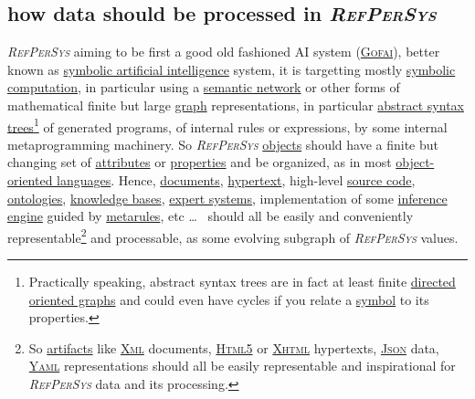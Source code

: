 \documentclass[11pt,a4paper,svgnames]{article}
\newcommand{\RefPerSys}{{\textit{\textsc{RefPerSys}}}}
\begin{document}
\subsection{how data should be processed in \RefPerSys}
\label{subsec:howdata}

{\RefPerSys} aiming to be first a good old fashioned AI system
(\href{http://bootstrappingartificialintelligence.fr/WordPress3/2013/12/the-future-of-ai-is-the-good-old-fashioned-artificial-intelligence/}{\textsc{Gofai}}),
better known as
\href{https://en.wikipedia.org/wiki/Symbolic\_artificial\_intelligence}{symbolic
  artificial intelligence} system, it is targetting mostly
\href{https://en.wikipedia.org/wiki/Computer\_algebra}{symbolic
  computation}, in particular using a
\href{https://en.wikipedia.org/wiki/Semantic\_network}{semantic
  network} or other forms of mathematical finite but large
\href{https://en.wikipedia.org/wiki/Graph\_(discrete\_mathematics)}{graph}
representations, in particular
\href{https://en.wikipedia.org/wiki/Abstract\_syntax\_tree}{abstract
  syntax trees}\footnote{Practically speaking, abstract syntax trees
are in fact at least finite
\href{https://en.wikipedia.org/wiki/Directed_acyclic_graph}{directed
  oriented graphs} and could even have cycles if you relate a
\href{https://en.wikipedia.org/wiki/Symbol\_(programming)}{symbol} to
its properties.} of generated programs, of internal rules or
expressions, by some internal metaprogramming machinery. So
{\RefPerSys}
\href{https://en.wikipedia.org/wiki/Object_(computer_science)}{objects}
should have a finite but changing set of
\href{https://en.wikipedia.org/wiki/Attribute_(computing)}{attributes}
or
\href{https://en.wikipedia.org/wiki/Property_(programming)}{properties}
and be organized, as in most
\href{https://en.wikipedia.org/wiki/Object-oriented_programming}{object-oriented
  languages}. Hence,
\href{https://en.wikipedia.org/wiki/Electronic\_document}{documents},
\href{https://en.wikipedia.org/wiki/Hypertext}{hypertext}, high-level
\href{https://en.wikipedia.org/wiki/Source\_code}{source code},
\href{https://en.wikipedia.org/wiki/Ontology\_(information\_science)}{ontologies},
\href{https://en.wikipedia.org/wiki/Knowledge\_base}{knowledge bases},
\href{https://en.wikipedia.org/wiki/Expert\_system}{expert systems},
implementation of some
\href{https://en.wikipedia.org/wiki/Inference_engine}{inference
  engine} guided by
\href{https://en.wiktionary.org/wiki/metarule}{metarules}, etc \ldots~
should all be easily and conveniently representable\footnote{So
\href{https://en.wikipedia.org/wiki/Artifact_(software_development)}{artifacts}
like \href{https://en.wikipedia.org/wiki/XML}{\textsc{Xml}} documents,
\href{https://en.wikipedia.org/wiki/HTML5}{\textsc{Html5}} or
\href{https://en.wikipedia.org/wiki/XHTML}{\textsc{Xhtml}} hypertexts,
\href{http://json.org/}{\textsc{Json}} data,
\href{https://yaml.org/}{\textsc{Yaml}} representations should all be
easily representable and inspirational for {\RefPerSys} data and its
processing.}  and processable, as some evolving subgraph of
{\RefPerSys} values.
\end{document}
